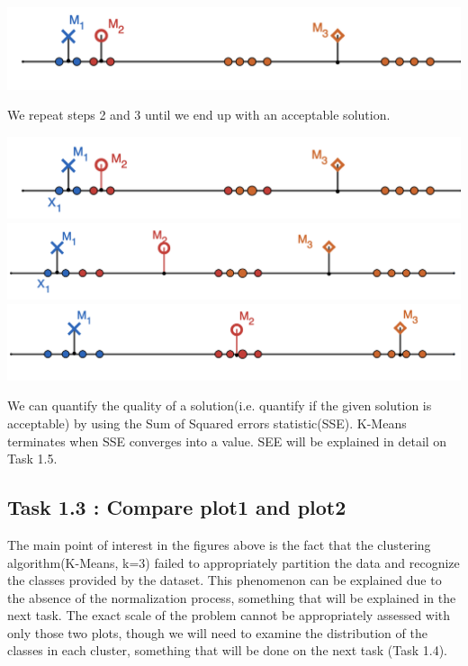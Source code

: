 \documentclass[11pt]{article}
\begin{document}
				\iftrue
				\begin{center}
					\includegraphics[scale=0.5]{res/t1/t12/t12-kmeans-5}
				\end{center}
				\fi
				We repeat steps 2 and 3 until we end up with an acceptable solution.
				\iftrue
				\begin{center}
					\includegraphics[scale=0.5]{res/t1/t12/t12-kmeans-6}
					\includegraphics[scale=0.5]{res/t1/t12/t12-kmeans-7}
					\includegraphics[scale=0.5]{res/t1/t12/t12-kmeans-8}
				\end{center}
				\fi
				We can quantify the quality of a solution(i.e. quantify if the given solution is acceptable) by using the Sum of Squared errors statistic(SSE). K-Means terminates when SSE converges into a value. SEE will be explained in detail on Task 1.5.
				
		 \subsection*{Task 1.3 : Compare plot1 and plot2}
			The main point of interest in the figures above is the fact that the clustering algorithm(K-Means, k=3) failed to appropriately partition the data and recognize the classes provided by the dataset. This phenomenon can be explained due to the absence of the normalization process, something that will be explained in the next task. The exact scale of the problem cannot be appropriately assessed with only those two plots, though we will need to examine the distribution of the classes in each cluster, something that will be done on the next task (Task 1.4).
		
\end{document}
